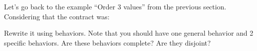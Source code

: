 

Let's go back to the example ``Order 3 values'' from the previous section. Considering
that the contract was:




Rewrite it using behaviors. Note that you should have one general behavior
and 2 specific behaviors. Are these behaviors complete? Are they disjoint?
